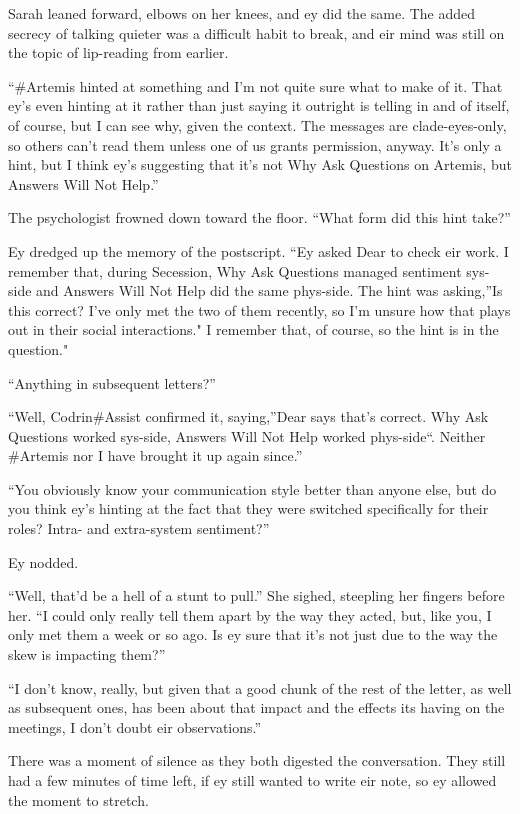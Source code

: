 Sarah leaned forward, elbows on her knees, and ey did the same. The added secrecy of talking quieter was a difficult habit to break, and eir mind was still on the topic of lip-reading from earlier.

``\#Artemis hinted at something and I'm not quite sure what to make of it. That ey's even hinting at it rather than just saying it outright is telling in and of itself, of course, but I can see why, given the context. The messages are clade-eyes-only, so others can't read them unless one of us grants permission, anyway. It's only a hint, but I think ey's suggesting that it's not Why Ask Questions on Artemis, but Answers Will Not Help.''

The psychologist frowned down toward the floor. ``What form did this hint take?''

Ey dredged up the memory of the postscript. ``Ey asked Dear to check eir work. I remember that, during Secession, Why Ask Questions managed sentiment sys-side and Answers Will Not Help did the same phys-side. The hint was asking,''Is this correct? I've only met the two of them recently, so I'm unsure how that plays out in their social interactions." I remember that, of course, so the hint is in the question."

``Anything in subsequent letters?''

``Well, Codrin\#Assist confirmed it, saying,''Dear says that's correct. Why Ask Questions worked sys-side, Answers Will Not Help worked phys-side``. Neither \#Artemis nor I have brought it up again since.''

``You obviously know your communication style better than anyone else, but do you think ey's hinting at the fact that they were switched specifically for their roles? Intra- and extra-system sentiment?''

Ey nodded.

``Well, that'd be a hell of a stunt to pull.'' She sighed, steepling her fingers before her. ``I could only really tell them apart by the way they acted, but, like you, I only met them a week or so ago. Is ey sure that it's not just due to the way the skew is impacting them?''

``I don't know, really, but given that a good chunk of the rest of the letter, as well as subsequent ones, has been about that impact and the effects its having on the meetings, I don't doubt eir observations.''

There was a moment of silence as they both digested the conversation. They still had a few minutes of time left, if ey still wanted to write eir note, so ey allowed the moment to stretch.

